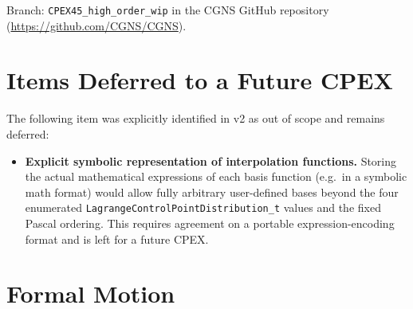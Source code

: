 \documentclass[11pt,letterpaper]{article}
\begin{document}
Branch: \texttt{CPEX45\_high\_order\_wip} in the CGNS GitHub repository
(\url{https://github.com/CGNS/CGNS}).

\section{Items Deferred to a Future CPEX}

The following item was explicitly identified in v2 as out of scope and remains deferred:

\begin{itemize}
  \item \textbf{Explicit symbolic representation of interpolation functions.}
  Storing the actual mathematical expressions of each basis function (e.g.\ in a symbolic
  math format) would allow fully arbitrary user-defined bases beyond the four enumerated
  \texttt{LagrangeControlPointDistribution\_t} values and the fixed Pascal ordering.  This
  requires agreement on a portable expression-encoding format and is left for a future CPEX.
\end{itemize}

\section{Formal Motion}
\end{document}
